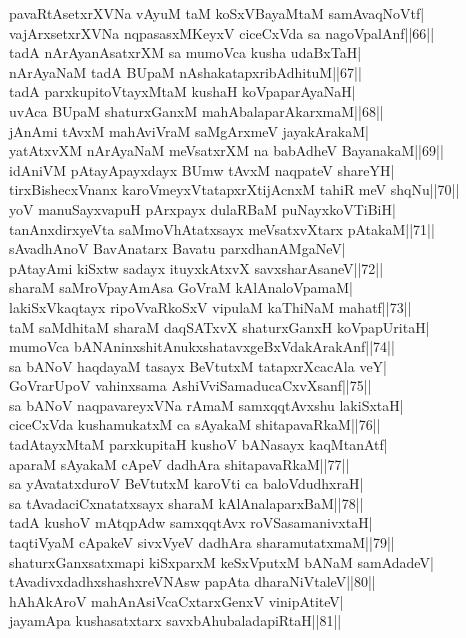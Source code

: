 \documentclass{article}
\begin{document}
pavaRtAsetxrXVNa vAyuM taM koSxVBayaMtaM samAvaqNoVtf|\\
vajArxsetxrXVNa nqpasasxMKeyxV ciceCxVda sa nagoVpalAnf||66||\\
tadA nArAyanAsatxrXM sa mumoVca kusha udaBxTaH|\\
nArAyaNaM tadA BUpaM nAshakatapxribAdhituM||67||\\
tadA parxkupitoVtayxMtaM kushaH koVpaparAyaNaH|\\
uvAca BUpaM shaturxGanxM mahAbalaparAkarxmaM||68||\\
jAnAmi tAvxM mahAviVraM saMgArxmeV jayakArakaM|\\
yatAtxvXM nArAyaNaM meVsatxrXM na babAdheV BayanakaM||69||\\
idAniVM pAtayApayxdayx BUmw tAvxM naqpateV shareYH|\\
tirxBishecxVnanx karoVmeyxVtatapxrXtijAcnxM tahiR meV shqNu||70||\\
yoV manuSayxvapuH pArxpayx dulaRBaM puNayxkoVTiBiH|\\
tanAnxdirxyeVta saMmoVhAtatxsayx meVsatxvXtarx pAtakaM||71||\\
sAvadhAnoV BavAnatarx Bavatu parxdhanAMgaNeV|\\
pAtayAmi kiSxtw sadayx ituyxkAtxvX savxsharAsaneV||72||\\
sharaM saMroVpayAmAsa GoVraM kAlAnaloVpamaM|\\
lakiSxVkaqtayx ripoVvaRkoSxV vipulaM kaThiNaM mahatf||73||\\
taM saMdhitaM sharaM daqSATxvX shaturxGanxH koVpapUritaH|\\
mumoVca bANAninxshitAnukxshatavxgeBxVdakArakAnf||74||\\
sa bANoV haqdayaM tasayx BeVtutxM tatapxrXcacAla veY|\\
GoVrarUpoV vahinxsama AshiVviSamaducaCxvXsanf||75||\\
sa bANoV naqpavareyxVNa rAmaM samxqqtAvxshu lakiSxtaH|\\
ciceCxVda kushamukatxM ca sAyakaM shitapavaRkaM||76||\\
tadAtayxMtaM parxkupitaH kushoV bANasayx kaqMtanAtf|\\
aparaM sAyakaM cApeV dadhAra shitapavaRkaM||77||\\
sa yAvatatxduroV BeVtutxM karoVti ca baloVdudhxraH|\\
sa tAvadaciCxnatatxsayx sharaM kAlAnalaparxBaM||78||\\
tadA kushoV mAtqpAdw samxqqtAvx roVSasamanivxtaH|\\
taqtiVyaM cApakeV sivxVyeV dadhAra sharamutatxmaM||79||\\
shaturxGanxsatxmapi kiSxparxM keSxVputxM bANaM samAdadeV|\\
tAvadivxdadhxshashxreVNAsw papAta dharaNiVtaleV||80||\\
hAhAkAroV mahAnAsiVcaCxtarxGenxV vinipAtiteV|\\
jayamApa kushasatxtarx savxbAhubaladapiRtaH||81||\\
\end{document}
